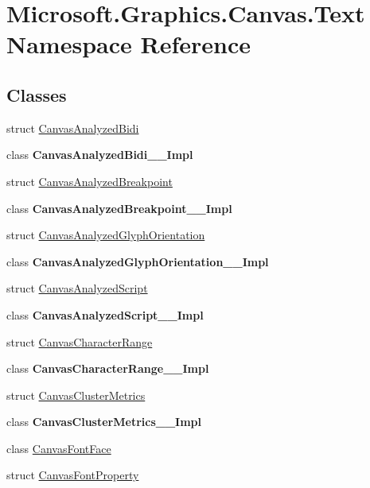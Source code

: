 \hypertarget{namespace_microsoft_1_1_graphics_1_1_canvas_1_1_text}{}\section{Microsoft.\+Graphics.\+Canvas.\+Text Namespace Reference}
\label{namespace_microsoft_1_1_graphics_1_1_canvas_1_1_text}
\subsection*{Classes}
\begin{DoxyCompactItemize}
\item 
struct \hyperlink{struct_microsoft_1_1_graphics_1_1_canvas_1_1_text_1_1_canvas_analyzed_bidi}{Canvas\+Analyzed\+Bidi}
\item 
class {\bfseries Canvas\+Analyzed\+Bidi\+\_\+\+\_\+\+Impl}
\item 
struct \hyperlink{struct_microsoft_1_1_graphics_1_1_canvas_1_1_text_1_1_canvas_analyzed_breakpoint}{Canvas\+Analyzed\+Breakpoint}
\item 
class {\bfseries Canvas\+Analyzed\+Breakpoint\+\_\+\+\_\+\+Impl}
\item 
struct \hyperlink{struct_microsoft_1_1_graphics_1_1_canvas_1_1_text_1_1_canvas_analyzed_glyph_orientation}{Canvas\+Analyzed\+Glyph\+Orientation}
\item 
class {\bfseries Canvas\+Analyzed\+Glyph\+Orientation\+\_\+\+\_\+\+Impl}
\item 
struct \hyperlink{struct_microsoft_1_1_graphics_1_1_canvas_1_1_text_1_1_canvas_analyzed_script}{Canvas\+Analyzed\+Script}
\item 
class {\bfseries Canvas\+Analyzed\+Script\+\_\+\+\_\+\+Impl}
\item 
struct \hyperlink{struct_microsoft_1_1_graphics_1_1_canvas_1_1_text_1_1_canvas_character_range}{Canvas\+Character\+Range}
\item 
class {\bfseries Canvas\+Character\+Range\+\_\+\+\_\+\+Impl}
\item 
struct \hyperlink{struct_microsoft_1_1_graphics_1_1_canvas_1_1_text_1_1_canvas_cluster_metrics}{Canvas\+Cluster\+Metrics}
\item 
class {\bfseries Canvas\+Cluster\+Metrics\+\_\+\+\_\+\+Impl}
\item 
class \hyperlink{class_microsoft_1_1_graphics_1_1_canvas_1_1_text_1_1_canvas_font_face}{Canvas\+Font\+Face}
\item 
struct \hyperlink{struct_microsoft_1_1_graphics_1_1_canvas_1_1_text_1_1_canvas_font_property}{Canvas\+Font\+Property}

\end{DoxyCompactItemize}
